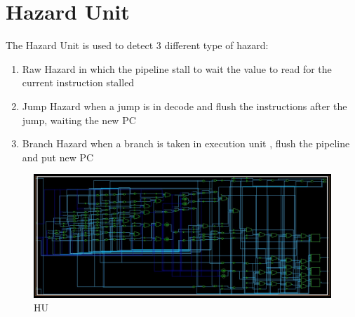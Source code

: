\chapter{Hazard Unit}
\label{Hazard Unit}

The Hazard Unit is used to detect 3 different type of hazard: 
\begin{enumerate} 
    \item Raw Hazard in which the pipeline stall to wait the value to read for the current instruction stalled
    \item Jump Hazard when a jump is in decode and flush the instructions after the jump, waiting the new PC
    \item Branch Hazard when a branch is taken in execution unit , flush the pipeline and put new PC
\end{enumerate}

\begin{figure}[h!]
    \centering
    \includegraphics[scale = 0.50]
    {chapters/figures/HU_highlevel}
    \caption{HU}
    \end{figure}

